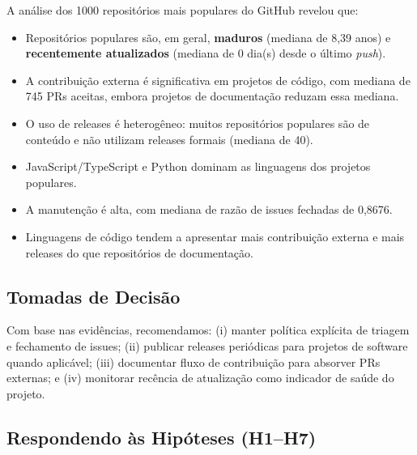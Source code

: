 \documentclass[10pt,a4paper,twocolumn]{article}
\begin{document}
A análise dos 1000 repositórios mais populares do GitHub revelou que:

\begin{itemize}
  \item Repositórios populares são, em geral, \textbf{maduros} (mediana de
    8,39 anos) e \textbf{recentemente atualizados}
    (mediana de 0 dia(s) desde o último \textit{push}).

  \item A contribuição externa é significativa em projetos de código, com
    mediana de 745 PRs aceitas, embora projetos de
    documentação reduzam essa mediana.

  \item O uso de releases é heterogêneo: muitos repositórios populares são de
    conteúdo e não utilizam releases formais (mediana de 40).

  \item JavaScript/TypeScript e Python dominam as linguagens dos projetos
    populares.

  \item A manutenção é alta, com mediana de razão de issues fechadas de
    0,8676.

  \item Linguagens de código tendem a apresentar mais contribuição externa e
    mais releases do que repositórios de documentação.
\end{itemize}

\subsection{Tomadas de Decisão}

Com base nas evidências, recomendamos: (i) manter política explícita de
triagem e fechamento de issues; (ii) publicar releases periódicas para projetos
de software quando aplicável; (iii) documentar fluxo de contribuição para
absorver PRs externas; e (iv) monitorar recência de atualização como indicador
de saúde do projeto.

\subsection{Respondendo às Hipóteses (H1--H7)}
\end{document}
